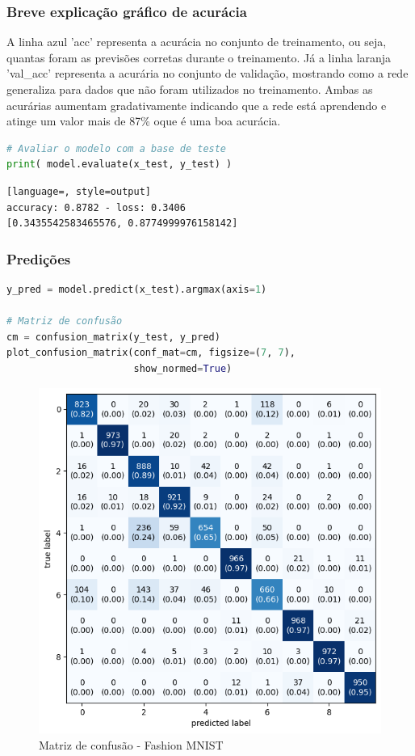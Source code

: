 \subsubsection*{Breve explicação gráfico de acurácia}
A linha azul 'acc' representa a acurácia no conjunto de treinamento, ou seja, quantas foram as previsões corretas durante o treinamento. Já a linha laranja 'val\_acc' representa a acurária no conjunto de validação, mostrando como a rede generaliza para dados que não foram utilizados no treinamento. Ambas as acurárias aumentam gradativamente indicando que a rede está aprendendo e atinge um valor mais de 87\% oque é uma boa acurácia.
\begin{lstlisting}[language=Python, style=input]
# Avaliar o modelo com a base de teste
print( model.evaluate(x_test, y_test) )
\end{lstlisting}
\begin{lstlisting}[language=, style=output]
accuracy: 0.8782 - loss: 0.3406
[0.3435542583465576, 0.8774999976158142]
\end{lstlisting}
\subsubsection*{Predições}
\begin{lstlisting}[language=Python, style=input]
y_pred = model.predict(x_test).argmax(axis=1)

# Matriz de confusão
cm = confusion_matrix(y_test, y_pred)
plot_confusion_matrix(conf_mat=cm, figsize=(7, 7),
                      show_normed=True)
\end{lstlisting}
\begin{figure}[H]
\centering
\includegraphics[width=.8\linewidth]{apendices/fig/13_IAA012_3.png}
\caption{Matriz de confusão - Fashion MNIST}
\end{figure}

